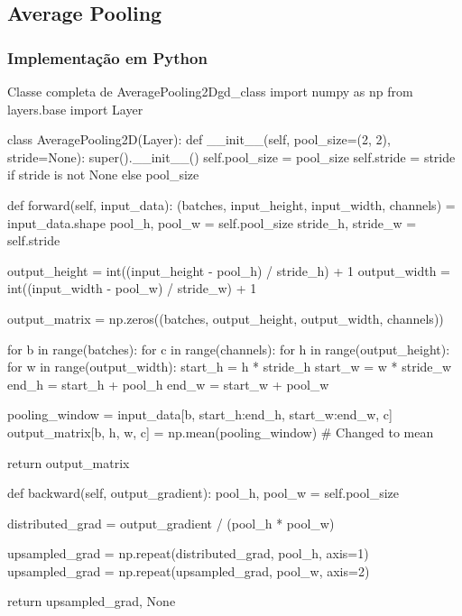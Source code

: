 \subsection{Average Pooling}

\subsubsection{Implementação em Python}

\begin{codelisting}{Classe completa de AveragePooling2D}{gd_class}
import numpy as np
from layers.base import Layer

class AveragePooling2D(Layer):
    def __init__(self, pool_size=(2, 2), stride=None):
        super().__init__()
        self.pool_size = pool_size
        self.stride = stride if stride is not None else pool_size

    def forward(self, input_data):
        (batches, input_height, input_width, channels) = input_data.shape
        pool_h, pool_w = self.pool_size
        stride_h, stride_w = self.stride

        output_height = int((input_height - pool_h) / stride_h) + 1
        output_width = int((input_width - pool_w) / stride_w) + 1

        output_matrix = np.zeros((batches, output_height, output_width, channels))

        for b in range(batches):
            for c in range(channels):
                for h in range(output_height):
                    for w in range(output_width):
                        start_h = h * stride_h
                        start_w = w * stride_w
                        end_h = start_h + pool_h
                        end_w = start_w + pool_w

                        pooling_window = input_data[b, start_h:end_h, start_w:end_w, c]
                        output_matrix[b, h, w, c] = np.mean(pooling_window)  # Changed to mean

        return output_matrix

    def backward(self, output_gradient):
        pool_h, pool_w = self.pool_size

        distributed_grad = output_gradient / (pool_h * pool_w)

        upsampled_grad = np.repeat(distributed_grad, pool_h, axis=1)
        upsampled_grad = np.repeat(upsampled_grad, pool_w, axis=2)

        return upsampled_grad, None

\end{codelisting}

